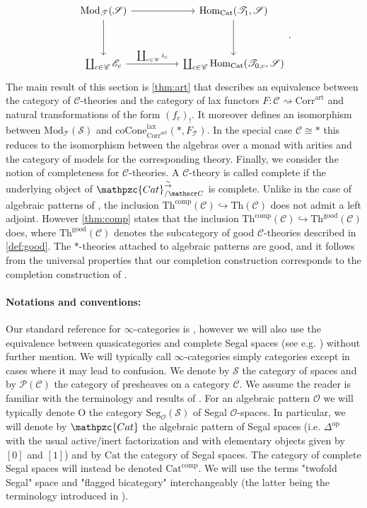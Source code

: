 \documentclass[a4paper, reqno]{amsart}
\theoremstyle{definition}
\newcommand\cC{\mathscr C}
\newcommand\cE{\mathscr E}
\newcommand\cO{\mathscr O}
\newcommand\cP{\mathscr P}
\newcommand\cS{\mathscr S}
\newcommand\cT{\mathscr T}
\newcommand\good{\mathrm{good}}
\newcommand\art{\mathrm{art}}
\newcommand\mor{\mathrm{Hom}}
\newcommand\op{\mathrm{op}}
\newcommand\cat{\mathrm{Cat}}
\newcommand\comp{\mathrm{comp}}
\newcommand\ccat{\mathpzc{Cat}}
\newcommand\thr{\mathrm{Th}}
\newcommand\corr{\mathrm{Corr}}
\newcommand\modl{\mathrm{Mod}}
\newcommand\lax{\mathrm{lax}}
\newcommand\wrr{{\overset{\sim}{\rightarrow}}}
\newcommand\seg{\mathrm{Seg}}
\newcommand\coc{\mathrm{coCone}}
\begin{document}
\[
\begin{tikzcd}[row sep=huge, column sep=huge]
\modl_\cT(\cS)\arrow[r]\arrow[d]&\mor_\cat(\cT_1,\cS)\arrow[d]\\
\coprod_{c\in\cC}\cE_c\arrow[r, "\coprod_{c\in\cC} i_c"]&\coprod_{c\in\cC}\mor_\cat(\cT_{0,c},\cS)
\end{tikzcd}.
\]
The main result of this section is \cref{thm:art} that describes an equivalence between the category of $\cC$-theories and the category of lax functors $F:\cC\rightsquigarrow\corr^\art$ and natural transformations of the form $(f_c)_!$. It moreover defines an isomorphism between $\modl_\cT(\cS)$ and $\coc^\lax_{\corr^\art}(*,F_\cT)$. In the special case $\cC\cong*$ this reduces to the isomorphism between the algebras over a monad with arities and the category of models for the corresponding theory. Finally, we consider the notion of completeness for $\cC$-theories. A $\cC$-theory is called complete if the underlying object of $\ccat^\wrr_{/\cC}$ is complete. Unlike in the case of algebraic patterns of \cite{chu2019homotopy}, the inclusion $\thr^\comp(\cC)\hookrightarrow\thr(\cC)$ does not admit a left adjoint. However \cref{thm:comp} states that the inclusion $\thr^\comp(\cC)\hookrightarrow\thr^\good(\cC)$ does, where $\thr^\good(\cC)$ denotes the subcategory of good $\cC$-theories described in \cref{def:good}. The $*$-theories attached to algebraic patterns are good, and it follows from the universal properties that our completion construction corresponds to the completion construction of \cite{chu2019homotopy}.
\paragraph{\textbf{Notations and conventions}:} Our standard reference for $\infty$-categories is \cite{lurie2009higher}, however we will also use the equivalence between quasicategories and complete Segal spaces (see e.g. \cite{joyal2007quasi}) without further mention. We will typically call $\infty$-categories simply categories except in cases where it may lead to confusion. We denote by $\cS$ the category of spaces and by $\cP(\cC)$ the category of presheaves on a category $\cC$. We assume the reader is familiar with the terminology and results of \cite{chu2019homotopy}. For an algebraic pattern $\cO$ we will typically denote $\mathrm{O}$ the category $\seg_\cO(\cS)$ of Segal $\cO$-spaces. In particular, we will denote by $\ccat$ the algebraic pattern of Segal spaces (i.e. $\Delta^\op$ with the usual active/inert factorization and with elementary objects given by $[0]$ and $[1]$) and by $\cat$ the category of Segal spaces. The category of complete Segal spaces will instead be denoted $\cat^\comp$. We will use the terms "twofold Segal" space and "flagged bicategory" interchangeably (the latter being the terminology introduced in \cite{ayala2018flagged}).
\end{document}
